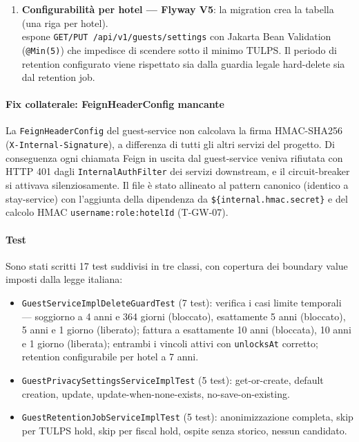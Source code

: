 ﻿\documentclass[a4paper,12pt]{report}
\begin{document}
\begin{enumerate}
  \item \textbf{Configurabilità per hotel --- Flyway V5}:
        la migration  crea la
        tabella \texttt{} (una riga per hotel).\\
        \texttt{} espone
        \texttt{GET/PUT /api/v1/guests/settings} con Jakarta Bean Validation
        (\texttt{@Min(5)}) che impedisce di scendere sotto il minimo TULPS.
        Il periodo di retention configurato viene rispettato sia dalla guardia
        legale hard-delete sia dal retention job.
\end{enumerate}

\paragraph{Fix collaterale: FeignHeaderConfig mancante}
La \texttt{FeignHeaderConfig} del guest-service non calcolava la firma
HMAC-SHA256 (\texttt{X-Internal-Signature}), a differenza di tutti gli altri
servizi del progetto. Di conseguenza ogni chiamata Feign in uscita dal
guest-service veniva rifiutata con HTTP 401 dagli \texttt{InternalAuthFilter}
dei servizi downstream, e il circuit-breaker si attivava silenziosamente.
Il file è stato allineato al pattern canonico (identico a stay-service)
con l'aggiunta della dipendenza da \texttt{\$\{internal.hmac.secret\}} e del
calcolo HMAC \texttt{username:role:hotelId} (T-GW-07).

\paragraph{Test}
Sono stati scritti 17 test suddivisi in tre classi, con copertura
dei boundary value imposti dalla legge italiana:

\begin{itemize}
  \item \texttt{GuestServiceImplDeleteGuardTest} (7 test): verifica i casi limite
        temporali — soggiorno a 4 anni e 364 giorni (bloccato), esattamente
        5 anni (bloccato), 5 anni e 1 giorno (liberato); fattura a esattamente
        10 anni (bloccata), 10 anni e 1 giorno (liberata); entrambi i vincoli
        attivi con \texttt{unlocksAt} corretto; retention configurabile
        per hotel a 7 anni.
  \item \texttt{GuestPrivacySettingsServiceImplTest} (5 test): get-or-create,
        default creation, update, update-when-none-exists, no-save-on-existing.
  \item \texttt{GuestRetentionJobServiceImplTest} (5 test): anonimizzazione
        completa, skip per TULPS hold, skip per fiscal hold, ospite senza
        storico, nessun candidato.
\end{itemize}
\end{document}
